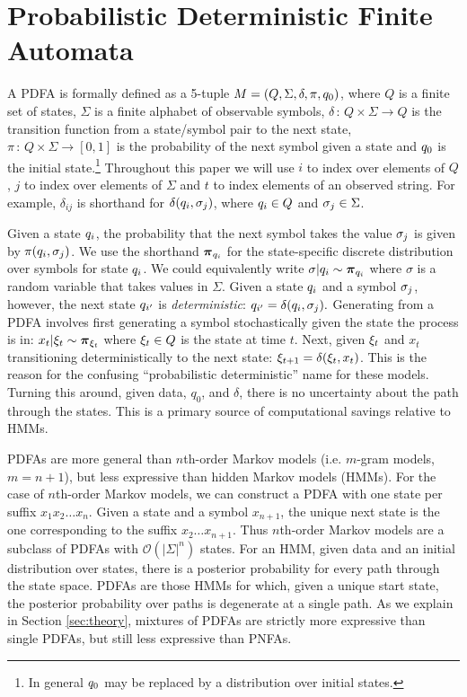 \section{Probabilistic Deterministic Finite Automata}
\label{sec:PDFA}

A PDFA is formally defined as a 5-tuple $M = (Q,\Sigma,\delta,\pi,\state_0)$, where $Q$ is a finite set of states, $\Sigma$ is a finite alphabet of observable symbols, $\delta\,:\,Q\times\Sigma\rightarrow Q$ is the transition function from a state/symbol pair to the next state, $\pi\,:\,Q\times\Sigma\rightarrow[0,1]$ is the probability of the next symbol given a state and $\state_0$ is the initial state.\footnote{In general $\state_0$ may be replaced by a distribution over initial states.  }  Throughout this paper we will use $i$ to index over elements of $Q$, $j$ to index over elements of $\Sigma$ and $t$ to index elements of an observed string.  For example, $\delta_{ij}$ is shorthand for $\delta(\state_i,\symb_j)$, where $\state_i \in Q$ and $\symb_j \in \Sigma$.

Given a state $\state_i$, the probability that the next symbol takes the value $\symb_j$ is given by $\pi(\state_i,\symb_j)$.  We use the shorthand $\bpi_{q_i}$ for the state-specific discrete distribution over symbols for state $\state_i$.  We could equivalently write $\sigma|\state_i \sim \bpi_{q_i}$ where $\sigma$ is a random variable that takes values in $\Sigma$.  Given a state $\state_i$ and a symbol $\symb_j$, however, the next state $\state_{i'}$ is {\it deterministic}: $\state_{i'} = \delta(\state_i,\symb_j).$   Generating from a PDFA involves first generating a symbol stochastically given the state the process is in: $x_t|\q_t \sim \bpi_{\q_t}$ where $\q_t \in Q$ is the state at time $t$.  Next, given $\q_t$ and $x_t$ transitioning deterministically to the next state: $\q_{t+1} = \delta(\q_t,x_t)$.  This is the reason for the confusing ``probabilistic deterministic'' name for these models.  Turning this around, given data, $q_0$, and $\delta$, there is no uncertainty about the path through the states.  This is a primary source of computational savings relative to HMMs.

PDFAs are more general than $n$th-order Markov models (i.e. $m$-gram models, $m=n+1$), but less expressive than hidden Markov models (HMMs)\cite{Dupont2005}.  For the case of $n$th-order Markov models, we can construct a PDFA with one state per suffix $x_1 x_2 \ldots x_n$.  Given a state and a symbol $x_{n+1}$, the unique next state is the one corresponding to the suffix $x_2 \ldots x_{n+1}$.  Thus $n$th-order Markov models are a subclass of PDFAs with $\mathcal{O}(|\Sigma|^n)$ states.  For an HMM, given data and an initial distribution over states, there is a posterior probability for every path through the state space.  PDFAs are those HMMs for which, given a unique start state, the posterior probability over paths is degenerate at a single path.  As we explain in Section \ref{sec:theory}, mixtures of PDFAs are strictly more expressive than single PDFAs, but still less expressive than PNFAs.